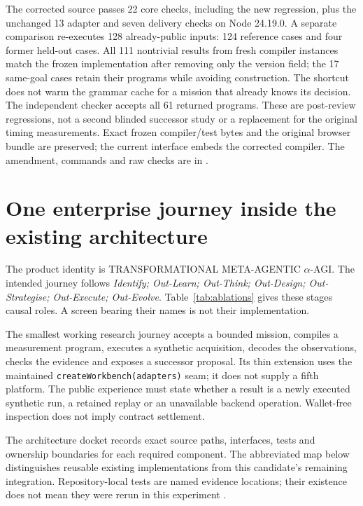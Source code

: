 \documentclass[11pt,letterpaper]{article}
\theoremstyle{definition}\newtheorem{definition}[theorem]{Definition}
\theoremstyle{remark}\newtheorem{remark}[theorem]{Remark}
\newcommand{\brand}{\texorpdfstring{TRANSFORMATIONAL META-AGENTIC $\alpha$-AGI}{TRANSFORMATIONAL META-AGENTIC alpha-AGI}}
\begin{document}
The corrected source passes 22 core checks, including the new regression, plus the unchanged 13 adapter and seven delivery checks on Node 24.19.0. A separate comparison re-executes 128 already-public inputs: 124 reference cases and four former held-out cases. All 111 nontrivial results from fresh compiler instances match the frozen implementation after removing only the version field; the 17 same-goal cases retain their programs while avoiding construction. The shortcut does not warm the grammar cache for a mission that already knows its decision. The independent checker accepts all 61 returned programs. These are post-review regressions, not a second blinded successor study or a replacement for the original timing measurements. Exact frozen compiler/test bytes and the original browser bundle are preserved; the current interface embeds the corrected compiler. The amendment, commands and raw checks are in .

\section{One enterprise journey inside the existing architecture}
\label{sec:architecture}
The product identity is \brand. The intended journey follows
\emph{Identify; Out-Learn; Out-Think; Out-Design; Out-Strategise; Out-Execute; Out-Evolve}.
Table~\ref{tab:ablations} gives these stages causal roles. A screen bearing their names is not their implementation.

The smallest working research journey accepts a bounded mission, compiles a measurement program, executes a synthetic acquisition, decodes the observations, checks the evidence and exposes a successor proposal. Its thin extension uses the maintained \texttt{createWorkbench(adapters)} seam; it does not supply a fifth platform. \AdapterImplementationNarrative{} The public experience must state whether a result is a newly executed synthetic run, a retained replay or an unavailable backend operation. Wallet-free inspection does not imply contract settlement.

The architecture docket records exact source paths, interfaces, tests and ownership boundaries for each required component. The abbreviated map below distinguishes reusable existing implementations from this candidate's remaining integration. Repository-local tests are named evidence locations; their existence does not mean they were rerun in this experiment \citep{alpharuntime,alphasuite,jobs,manager,fleet,coordination}.
\end{document}
